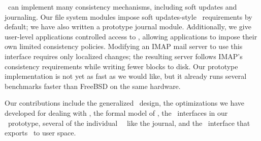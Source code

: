 \Chdescs\ can implement many consistency mechanisms, including
 soft updates and journaling.
%
Our file system modules impose soft updates-style \chdesc\
 requirements by default; we have also written a prototype journal module. 
%
Additionally, we give user-level applications controlled access to \chdescs,
allowing applications to impose their own limited consistency
 policies.
%
Modifying an IMAP mail server to use this interface requires only localized
 changes; the resulting server follows IMAP's consistency
 requirements while writing fewer blocks to disk.
%
Our prototype implementation is not yet as fast as we would like, but it
 already runs several benchmarks faster than FreeBSD on the same hardware.

\begin{comment}
 not ACID transactions: transactions should be independent, but any file
 system client can observe all active \chdescs), we believe that using
 \chdescs\ will allow the construction of consistent, modular, extensible
 file systems that are much easier to understand.
\end{comment}


Our contributions include the generalized \chdesc\ design, the
 optimizations we have developed for dealing with \chdescs, the formal
 model of \chdescs, the \module\ interfaces in our \Kudos\ prototype,
 several of the individual \Kudos\ \modules\ like the journal, and the
 \opgroup\ interface that exports \chdescs\ to user space.


